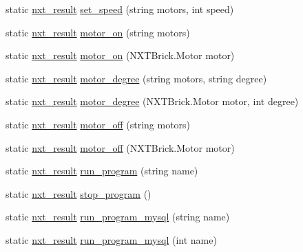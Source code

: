 \begin{CompactItemize}
\item 
static \hyperlink{class_lego___mind_storm___control___api_1_1nxt__result}{nxt\_\-result} \hyperlink{class_lego___mind_storm___control___api_1_1_n_x_t___r_o_v_e_r___c_o_n_t_r_o_l_d575f3c6f89bad772dda191101f98d35}{set\_\-speed} (string motors, int speed)
\item 
static \hyperlink{class_lego___mind_storm___control___api_1_1nxt__result}{nxt\_\-result} \hyperlink{class_lego___mind_storm___control___api_1_1_n_x_t___r_o_v_e_r___c_o_n_t_r_o_l_21fcfa97e6b3394f5f5ea28ef864fed1}{motor\_\-on} (string motors)
\item 
static \hyperlink{class_lego___mind_storm___control___api_1_1nxt__result}{nxt\_\-result} \hyperlink{class_lego___mind_storm___control___api_1_1_n_x_t___r_o_v_e_r___c_o_n_t_r_o_l_7b9e1bc3c9542efb5bc3a256355a0e0c}{motor\_\-on} (NXTBrick.Motor motor)
\item 
static \hyperlink{class_lego___mind_storm___control___api_1_1nxt__result}{nxt\_\-result} \hyperlink{class_lego___mind_storm___control___api_1_1_n_x_t___r_o_v_e_r___c_o_n_t_r_o_l_5bf618c31f68327d09a1453dcbdbcf7e}{motor\_\-degree} (string motors, string degree)
\item 
static \hyperlink{class_lego___mind_storm___control___api_1_1nxt__result}{nxt\_\-result} \hyperlink{class_lego___mind_storm___control___api_1_1_n_x_t___r_o_v_e_r___c_o_n_t_r_o_l_838bd0afb9aa7fc689e7217dafe84e2a}{motor\_\-degree} (NXTBrick.Motor motor, int degree)
\item 
static \hyperlink{class_lego___mind_storm___control___api_1_1nxt__result}{nxt\_\-result} \hyperlink{class_lego___mind_storm___control___api_1_1_n_x_t___r_o_v_e_r___c_o_n_t_r_o_l_7ead07361e1aadcefbb98694830446a2}{motor\_\-off} (string motors)
\item 
static \hyperlink{class_lego___mind_storm___control___api_1_1nxt__result}{nxt\_\-result} \hyperlink{class_lego___mind_storm___control___api_1_1_n_x_t___r_o_v_e_r___c_o_n_t_r_o_l_334b0c866e932f85ebc8f9c8b3a6671b}{motor\_\-off} (NXTBrick.Motor motor)
\item 
static \hyperlink{class_lego___mind_storm___control___api_1_1nxt__result}{nxt\_\-result} \hyperlink{class_lego___mind_storm___control___api_1_1_n_x_t___r_o_v_e_r___c_o_n_t_r_o_l_a93ca864bef9d9ce87d3a418fa565651}{run\_\-program} (string name)
\item 
static \hyperlink{class_lego___mind_storm___control___api_1_1nxt__result}{nxt\_\-result} \hyperlink{class_lego___mind_storm___control___api_1_1_n_x_t___r_o_v_e_r___c_o_n_t_r_o_l_9e234f6d3b3f05841e4b821576fa94a4}{stop\_\-program} ()
\item 
static \hyperlink{class_lego___mind_storm___control___api_1_1nxt__result}{nxt\_\-result} \hyperlink{class_lego___mind_storm___control___api_1_1_n_x_t___r_o_v_e_r___c_o_n_t_r_o_l_1ad9c4f533fb338d06d75754c6e7648d}{run\_\-program\_\-mysql} (string name)
\item 
static \hyperlink{class_lego___mind_storm___control___api_1_1nxt__result}{nxt\_\-result} \hyperlink{class_lego___mind_storm___control___api_1_1_n_x_t___r_o_v_e_r___c_o_n_t_r_o_l_d0c4ed208a9bcaa8012ca03d2fe9a878}{run\_\-program\_\-mysql} (int name)
\end{CompactItemize}

